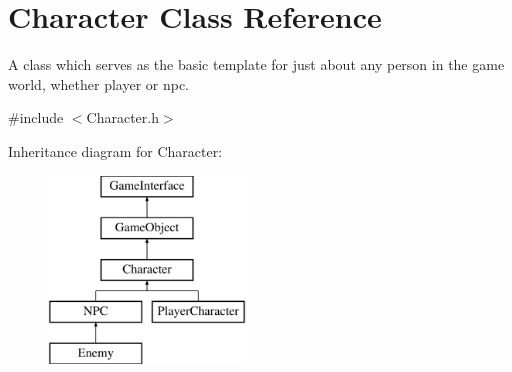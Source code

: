 \hypertarget{class_character}{\section{Character Class Reference}
\label{class_character}
}


A class which serves as the basic template for just about any person in the game world, whether player or npc.  




{\ttfamily \#include $<$Character.\-h$>$}

Inheritance diagram for Character\-:\begin{figure}[H]
\begin{center}
\leavevmode
\includegraphics[height=5.000000cm]{class_character}
\end{center}
\end{figure}
